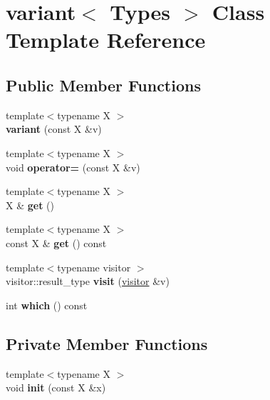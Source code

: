 \hypertarget{classvariant}{}\section{variant$<$ Types $>$ Class Template Reference}
\label{classvariant}
\subsection*{Public Member Functions}
\begin{DoxyCompactItemize}
\item 
\mbox{\label{classvariant_a8e08a93c5c54356404be69ee710ed227}} 
{\footnotesize template$<$typename X $>$ }\\{\bfseries variant} (const X \&v)
\item 
\mbox{\label{classvariant_a623d5000d37097f14883358081320887}} 
{\footnotesize template$<$typename X $>$ }\\void {\bfseries operator=} (const X \&v)
\item 
\mbox{\label{classvariant_a3dbe94c44965616a28f9c754fa3cf746}} 
{\footnotesize template$<$typename X $>$ }\\X \& {\bfseries get} ()
\item 
\mbox{\label{classvariant_a07e48e5037833d4723a09a3f8288e57a}} 
{\footnotesize template$<$typename X $>$ }\\const X \& {\bfseries get} () const
\item 
\mbox{\label{classvariant_afcb0946bb4f9643eac5aa0569add81ae}} 
{\footnotesize template$<$typename visitor $>$ }\\visitor\+::result\+\_\+type {\bfseries visit} (\hyperlink{structvisitor}{visitor} \&v)
\item 
\mbox{\label{classvariant_ac9fc2031ac1cb2d604032f979b54ca80}} 
int {\bfseries which} () const
\end{DoxyCompactItemize}
\subsection*{Private Member Functions}
\begin{DoxyCompactItemize}
\item 
\mbox{\label{classvariant_a252b0f6cd6a7219fbdce644bee16afac}} 
{\footnotesize template$<$typename X $>$ }\\void {\bfseries init} (const X \&x)
\end{DoxyCompactItemize}
